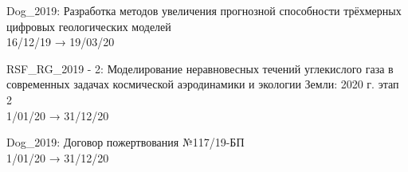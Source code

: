 \documentclass[11pt]{res} %
\begin{document}
\begin{resume}
Dog\_2019: Разработка методов увеличения прогнозной способности трёхмерных цифровых геологических моделей \\
16/12/19 → 19/03/20

RSF\_RG\_2019 - 2: Моделирование неравновесных течений углекислого газа в современных задачах космической аэродинамики и экологии Земли: 2020 г. этап 2 \\
1/01/20 → 31/12/20

Dog\_2019: Договор пожертвования №117/19-БП \\
1/01/20 → 31/12/20


\end{resume}
\end{document}
